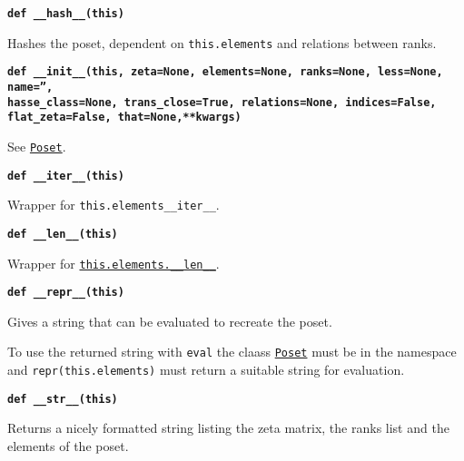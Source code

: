 \documentclass[12pt]{article}
\begin{document}
\begin{child}
{{}\endlist}

\textbf{\hypertarget{Poset.__hash__}{\texttt{def \_\_hash\_\_(this)}}}
{\list{}{\leftmargin 0.5cm}\item{
Hashes the poset, dependent on \verb|this.elements| and relations between
ranks.


}\endlist}

\textbf{\hypertarget{Poset.__init__}{\texttt{def \_\_init\_\_(this, zeta=None, elements=None, ranks=None, less=None, name='',}}}\\
\textbf{\texttt{hasse\_class=None, trans\_close=True, relations=None, indices=False, flat\_zeta=False, that=None,**kwargs)}}
\\
{\list{}{\leftmargin 0.5cm}\item{
See \hyperlink{Poset}{\texttt{Poset}}.


}\endlist}

\textbf{\hypertarget{Poset.__iter__}{\texttt{def \_\_iter\_\_(this)}}}
{\list{}{\leftmargin 0.5cm}\item{
Wrapper for \verb|this.elements__iter__|.


}\endlist}

\textbf{\hypertarget{Poset.__len__}{\texttt{def \_\_len\_\_(this)}}}
{\list{}{\leftmargin 0.5cm}\item{
Wrapper for \hyperlink{Poset.__len__}{\texttt{this.elements.\_\_len\_\_}}.


}\endlist}

\textbf{\hypertarget{Poset.__repr__}{\texttt{def \_\_repr\_\_(this)}}}
{\list{}{\leftmargin 0.5cm}\item{
Gives a string that can be evaluated to recreate the poset.

To use the returned string with \verb|eval| the claass \hyperlink{Poset}{\texttt{Poset}} must be in the namespace and \verb|repr(this.elements)|
must return a suitable string for evaluation.


}\endlist}

\textbf{\hypertarget{Poset.__str__}{\texttt{def \_\_str\_\_(this)}}}
{\list{}{\leftmargin 0.5cm}\item{
Returns a nicely formatted string listing the zeta matrix, the ranks list and the elements of the poset.


}}
\end{child}
\end{document}
